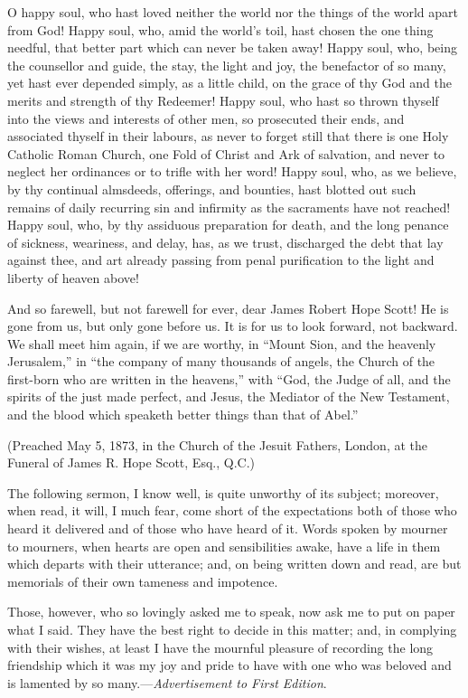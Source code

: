 O happy soul, who hast loved neither the world nor the
things of the world apart from God! Happy soul, who, amid
the world's toil, hast chosen the one thing needful, that
better part which can never be taken away! Happy soul,
who, being the counsellor and guide, the stay, the light
and joy, the benefactor of so many, yet hast ever
depended simply, as a little child, on the grace of thy
God and the merits and strength of thy Redeemer! Happy
soul, who hast so thrown thyself into the views and
interests of other men, so prosecuted their ends, and
associated thyself in their labours, as never to forget
still that there is one Holy Catholic Roman Church, one
Fold of Christ and Ark of salvation, and never to neglect
her ordinances or to trifle with her word! Happy soul,
who, as we believe, by thy continual almsdeeds,
offerings, and bounties, hast blotted out such remains of
daily recurring sin and infirmity as the sacraments have
not reached! Happy soul, who, by thy assiduous
preparation for death, and the long penance of sickness,
weariness, and delay, has, as we trust, discharged the
debt that lay against thee, and art already passing from
penal purification to the light and liberty of heaven
above!

And so farewell, but not farewell for ever, dear James
Robert Hope Scott! He is gone from us, but only gone
before us. It is for us to look forward, not backward. We
shall meet him again, if we are worthy, in ``Mount
Sion, and the heavenly Jerusalem,'' in ``the
company of many thousands of angels, the Church of the
first-born who are written in the heavens,'' with
``God, the Judge of all, and the spirits of the just
made perfect, and Jesus, the Mediator of the New
Testament, and the blood which speaketh better things
than that of Abel.''

(Preached May 5, 1873, in the Church of the Jesuit
Fathers, London, at the Funeral of James R. Hope Scott,
Esq., Q.C.)


The following sermon, I know well, is quite unworthy
of its subject; moreover, when read, it will, I much
fear, come short of the expectations both of those who
heard it delivered and of those who have heard of it.
Words spoken by mourner to mourners, when hearts are open
and sensibilities awake, have a life in them which
departs with their utterance; and, on being written down
and read, are but memorials of their own tameness and
impotence.

Those, however, who so lovingly asked me to speak, now
ask me to put on paper what I said. They have the best
right to decide in this matter; and, in complying with
their wishes, at least I have the mournful pleasure of
recording the long friendship which it was my joy and
pride to have with one who was beloved and is lamented by
so many.—\emph{Advertisement to First Edition}.

